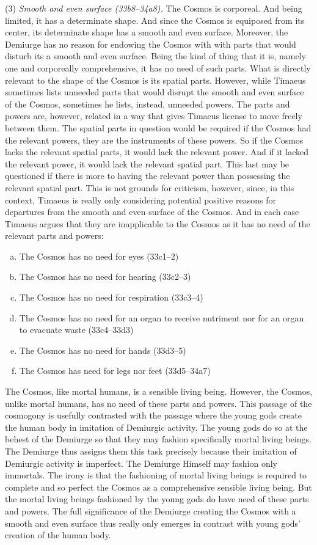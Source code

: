 (3) \emph{Smooth and even surface (33b8--34a8).} The Cosmos is corporeal. And being limited, it has a determinate shape. And since the Cosmos is equiposed from its center, its determinate shape has a smooth and even surface. Moreover, the Demiurge has no reason for endowing the Cosmos with with parts that would disturb its a smooth and even surface. Being the kind of thing that it is, namely one and corporeally comprehensive, it has no need of such parts. What is directly relevant to the shape of the Cosmos is its spatial parts. However, while Timaeus sometimes lists unneeded parts that would disrupt the smooth and even surface of the Cosmos, sometimes he lists, instead, unneeded powers. The parts and powers are, however, related in a way that gives Timaeus license to move freely between them. The spatial parts in question would be required if the Cosmos had the relevant powers, they are the instruments of these powers. So if the Cosmos lacks the relevant spatial parts, it would lack the relevant power. And if it lacked the relevant power, it would lack the relevant spatial part. This last may be questioned if there is more to having the relevant power than possessing the relevant spatial part. This is not grounds for criticism, however, since, in this context, Timaeus is really only considering potential positive reasons for departures from the smooth and even surface of the Cosmos. And in each case Timaeus argues that they are inapplicable to the Cosmos as it has no need of the relevant parts and powers:
\begin{enumerate}[(a)]
	\item The Cosmos has no need for eyes (33c1--2)
	\item The Cosmos has no need for hearing (33c2--3)
	\item The Cosmos has no need for respiration (33c3--4)
	\item The Cosmos has no need for an organ to receive nutriment nor for an organ to evacuate waste (33c4--33d3)
	\item The Cosmos has no need for hands (33d3--5)
	\item The Cosmos has need for legs nor feet (33d5--34a7)
\end{enumerate}
The Cosmos, like mortal humans, is a sensible living being. However, the Cosmos, unlike mortal humans, has no need of these parts and powers. This passage of the cosmogony is usefully contrasted with the passage where the young gods create the human body in imitation of Demiurgic activity. The young gods do so at the behest of the Demiurge so that they may fashion specifically mortal living beings. The Demiurge thus assigns them this task precisely because their imitation of Demiurgic activity is imperfect. The Demiurge Himself may fashion only immortals. The irony is that the fashioning of mortal living beings is required to complete and so perfect the Cosmos as a comprehensive sensible living being. But the mortal living beings fashioned by the young gods do have need of these parts and powers. The full significance of the Demiurge creating the Cosmos with a smooth and even surface thus really only emerges in contrast with young gods' creation of the human body. 

